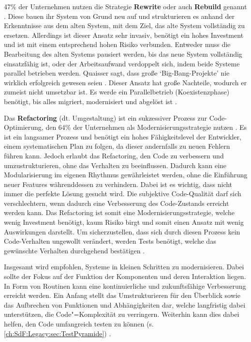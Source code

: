 47\% der Unternehmen nutzen die Strategie \textbf{Rewrite} oder auch \textbf{Rebuild} genannt \cite{AxelKannenberg:2025}. Diese bauen ihr System von Grund neu auf und strukturieren es anhand der Erkenntnisse aus dem alten System, mit dem Ziel, das alte System vollständig zu ersetzen.
Allerdings ist dieser Ansatz sehr invasiv, benötigt ein hohes Investment und ist mit einem entsprechend hohen Risiko verbunden. Entweder muss die Bearbeitung des alten Systems pausiert werden, bis das neue System vollständig einsatzfähig ist, oder der Arbeitsaufwand verdoppelt sich, indem beide Systeme parallel betrieben werden.
Quaisser sagt, dass große ‘Big-Bang-Projekte’ nie wirklich erfolgreich gewesen seien \cite[zitiert nach][]{FlorianStocker:2024}. Dieser Ansatz hat große Nachteile, wodurch er zumeist nicht umsetzbar ist. Es werde ein Parallelbetrieb (Koexistenzphase) benötigt, bis alles migriert, modernisiert und abgelöst ist \cite{FlorianStocker:2024}.
\cites{AxelKannenberg:2025}[S. 127]{ElMorabea:2021}[S. 5]{Feathers:2013}[S. 19]{Stantchev:2010}

Das \textbf{Refactoring} (dt. Umgestaltung) ist ein sukzessiver Prozess zur Code-Optimierung, den 64\% der Unternehmen als Modernisierungsstrategie nutzen \cite{AxelKannenberg:2025}. 
Es ist ein langsamer Prozess und benötigt ein hohes Fähigkeitslevel der Entwickler, einem systematischen Plan zu folgen, da dieser andernfalls zu neuen Fehlern führen kann.
Jedoch erlaubt das Refactoring, den Code zu verbessern und umzustrukturieren, ohne das Verhalten zu beeinflussen. Dadurch kann eine Modularisierung im eigenen Rhythmus gewährleistet werden, ohne die Einführung neuer Features währenddessen zu verhindern. Dabei ist es wichtig, dass nicht immer die perfekte Lösung gesucht wird. Die subjektive Code-Qualität darf sich verschlechtern, wenn dadurch eine Verbesserung des Code-Zustands erreicht werden kann.
Das Refactoring ist somit eine Modernisierungsstrategie, welche wenig Investment benötigt, kaum Risiko birgt und somit einen Ansatz mit wenig Auswirkungen darstellt.
Um sicherzustellen, dass sich durch diesen Prozess kein Code-Verhalten ungewollt verändert, werden Tests benötigt, welche das gewünschte Verhalten durchgehend bestätigen
\cites[S. 127]{ElMorabea:2021}[S. 5]{Feathers:2013}.

Insgesamt wird empfohlen, Systeme in kleinen Schritten zu modernisieren. Dabei sollte der Fokus auf der Funktion der Komponenten und deren Interaktion liegen. In Form von Routinen kann eine kontinuierliche und zukunftsfähige Verbesserung erreicht werden. Ein Anfang stellt das Umstrukturieren für den Überblick sowie das Aufbrechen von Funktionen und Abhängigkeiten dar, welche langfristig dabei unterstützen, die Code"=Komplexität zu verringern. Weiterhin kann dies dabei helfen, den Code umfangreich testen zu können (s. \autoref{ch:SdF:Legacy:sec:TestPyramide})
\cites[S. 18]{Feathers:2013}{NadineRiederer:2022}.
